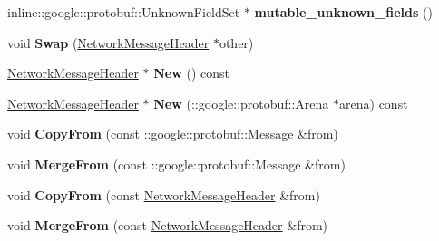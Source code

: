 \begin{DoxyCompactItemize}
\item 
\hypertarget{classSimpleChat_1_1NetworkMessageHeader_a3e1df7d2aa1262ef8e17e2f5fdad7d40}{inline\-::google\-::protobuf\-::\-Unknown\-Field\-Set $\ast$ {\bfseries mutable\-\_\-unknown\-\_\-fields} ()}\label{classSimpleChat_1_1NetworkMessageHeader_a3e1df7d2aa1262ef8e17e2f5fdad7d40}

\item 
\hypertarget{classSimpleChat_1_1NetworkMessageHeader_ac12a19d7792504929483161b3489106d}{void {\bfseries Swap} (\hyperlink{classSimpleChat_1_1NetworkMessageHeader}{Network\-Message\-Header} $\ast$other)}\label{classSimpleChat_1_1NetworkMessageHeader_ac12a19d7792504929483161b3489106d}

\item 
\hypertarget{classSimpleChat_1_1NetworkMessageHeader_a6ceb4050a7cd60080404951418794879}{\hyperlink{classSimpleChat_1_1NetworkMessageHeader}{Network\-Message\-Header} $\ast$ {\bfseries New} () const }\label{classSimpleChat_1_1NetworkMessageHeader_a6ceb4050a7cd60080404951418794879}

\item 
\hypertarget{classSimpleChat_1_1NetworkMessageHeader_aeb297b2d6557953e416b452460587c2d}{\hyperlink{classSimpleChat_1_1NetworkMessageHeader}{Network\-Message\-Header} $\ast$ {\bfseries New} (\-::google\-::protobuf\-::\-Arena $\ast$arena) const }\label{classSimpleChat_1_1NetworkMessageHeader_aeb297b2d6557953e416b452460587c2d}

\item 
\hypertarget{classSimpleChat_1_1NetworkMessageHeader_ac53c26c6d84a5116fb42d70a53008303}{void {\bfseries Copy\-From} (const \-::google\-::protobuf\-::\-Message \&from)}\label{classSimpleChat_1_1NetworkMessageHeader_ac53c26c6d84a5116fb42d70a53008303}

\item 
\hypertarget{classSimpleChat_1_1NetworkMessageHeader_a6205622710d8485ab9ffd8d794631cfc}{void {\bfseries Merge\-From} (const \-::google\-::protobuf\-::\-Message \&from)}\label{classSimpleChat_1_1NetworkMessageHeader_a6205622710d8485ab9ffd8d794631cfc}

\item 
\hypertarget{classSimpleChat_1_1NetworkMessageHeader_ab460c8fa9abd6314b0cf49be2c6e26de}{void {\bfseries Copy\-From} (const \hyperlink{classSimpleChat_1_1NetworkMessageHeader}{Network\-Message\-Header} \&from)}\label{classSimpleChat_1_1NetworkMessageHeader_ab460c8fa9abd6314b0cf49be2c6e26de}

\item 
\hypertarget{classSimpleChat_1_1NetworkMessageHeader_a02696f7c2f6bbff7c82f64fd1f615599}{void {\bfseries Merge\-From} (const \hyperlink{classSimpleChat_1_1NetworkMessageHeader}{Network\-Message\-Header} \&from)}\label{classSimpleChat_1_1NetworkMessageHeader_a02696f7c2f6bbff7c82f64fd1f615599}


\end{DoxyCompactItemize}
